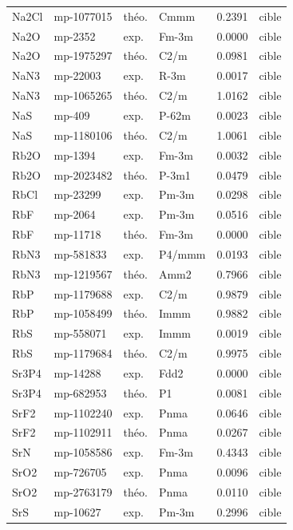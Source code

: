 \begin{longtable}{@{}lllllr@{}}
Na2Cl & mp-1077015 & théo. & Cmmm & 0.2391 & cible \\
Na2O & mp-2352 & exp. & Fm-3m & 0.0000 & cible \\
Na2O & mp-1975297 & théo. & C2/m & 0.0981 & cible \\
NaN3 & mp-22003 & exp. & R-3m & 0.0017 & cible \\
NaN3 & mp-1065265 & théo. & C2/m & 1.0162 & cible \\
NaS & mp-409 & exp. & P-62m & 0.0023 & cible \\
NaS & mp-1180106 & théo. & C2/m & 1.0061 & cible \\
Rb2O & mp-1394 & exp. & Fm-3m & 0.0032 & cible \\
Rb2O & mp-2023482 & théo. & P-3m1 & 0.0479 & cible \\
RbCl & mp-23299 & exp. & Pm-3m & 0.0298 & cible \\
RbF & mp-2064 & exp. & Pm-3m & 0.0516 & cible \\
RbF & mp-11718 & théo. & Fm-3m & 0.0000 & cible \\
RbN3 & mp-581833 & exp. & P4/mmm & 0.0193 & cible \\
RbN3 & mp-1219567 & théo. & Amm2 & 0.7966 & cible \\
RbP & mp-1179688 & exp. & C2/m & 0.9879 & cible \\
RbP & mp-1058499 & théo. & Immm & 0.9882 & cible \\
RbS & mp-558071 & exp. & Immm & 0.0019 & cible \\
RbS & mp-1179684 & théo. & C2/m & 0.9975 & cible \\
Sr3P4 & mp-14288 & exp. & Fdd2 & 0.0000 & cible \\
Sr3P4 & mp-682953 & théo. & P1 & 0.0081 & cible \\
SrF2 & mp-1102240 & exp. & Pnma & 0.0646 & cible \\
SrF2 & mp-1102911 & théo. & Pnma & 0.0267 & cible \\
SrN & mp-1058586 & exp. & Fm-3m & 0.4343 & cible \\
SrO2 & mp-726705 & exp. & Pnma & 0.0096 & cible \\
SrO2 & mp-2763179 & théo. & Pnma & 0.0110 & cible \\
SrS & mp-10627 & exp. & Pm-3m & 0.2996 & cible \\
\end{longtable}
